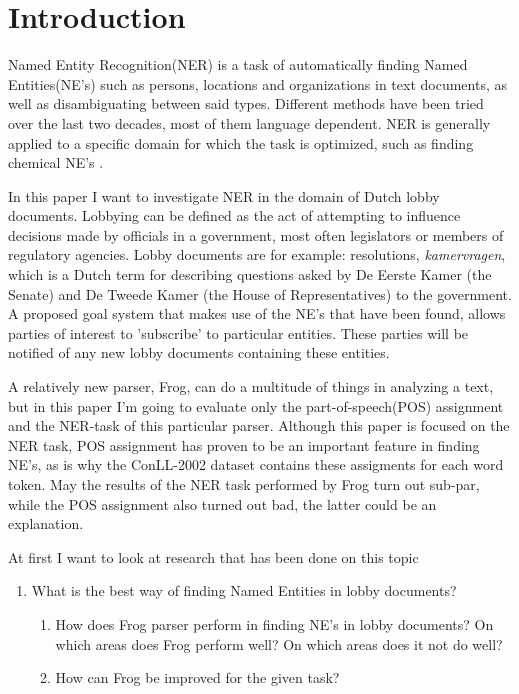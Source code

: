 \section{Introduction} \label{sec:intro}
Named Entity Recognition(NER) is a task of automatically finding Named Entities(NE's) such as persons, locations and organizations in text documents, as well as disambiguating between said types. Different methods have been tried over the last two decades, most of them language dependent. NER is generally applied to a specific domain for which the task is optimized, such as finding chemical NE's \cite{rocktaschel2012chemspot}. 

In this paper I want to investigate NER in the domain of Dutch lobby documents. Lobbying can be defined as the act of attempting to influence decisions made by officials in a government, most often legislators or members of regulatory agencies. Lobby documents are for example: resolutions, \textit{kamervragen}, which is a Dutch term for describing questions asked by De Eerste Kamer (the Senate) and De Tweede Kamer (the House of Representatives) to the government. A proposed goal system that makes use of the NE's that have been found, allows parties of interest to 'subscribe' to particular entities. These parties will be notified of any new lobby documents containing these entities. 

A relatively new parser, Frog, can do a multitude of things in analyzing a text, but in this paper I'm going to evaluate only the part-of-speech(POS) assignment and the NER-task of this particular parser. Although this paper is focused on the NER task, POS assignment has proven to be an important feature in finding NE's, as is why the ConLL-2002 dataset contains these assigments for each word token. May the results of the NER task performed by Frog turn out sub-par, while the POS assignment also turned out bad, the latter could be an explanation.

At first I want to look at research that has been done on this topic

\begin{enumerate}
    \item What is the best way of finding Named Entities in lobby documents?
    \begin{enumerate}
        \item   How does Frog parser perform in finding NE's in lobby documents?  On which areas does Frog perform well? On which areas does it not do well?
        \item How can Frog be improved for the given task?
    \end{enumerate}
\end{enumerate}


